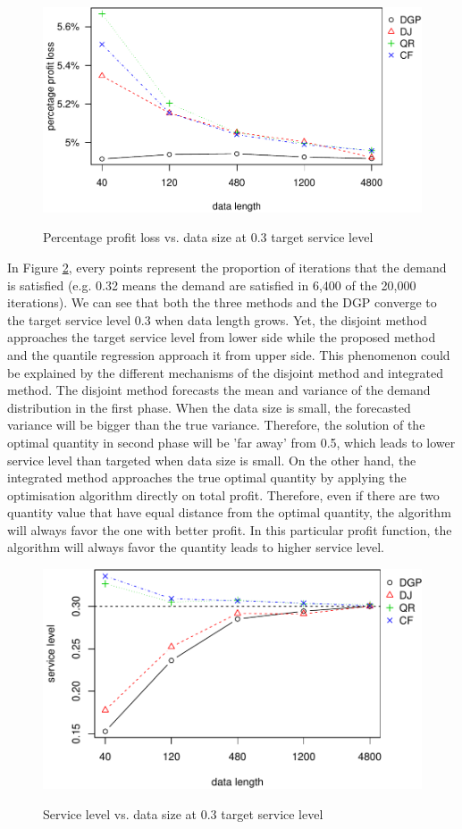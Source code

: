 \documentclass{article}
\begin{document}
\begin{figure}[ht]
\centering
\caption{Percentage profit loss vs. data size at 0.3 target service level}
\includegraphics{ppl0.3-1.pdf}
\label{fig:ppl0.3}
\end{figure}

In Figure \ref{fig:sl0.3}, every points represent the proportion of iterations that the demand is satisfied (e.g. 0.32 means the demand are satisfied in 6,400 of the 20,000 iterations). We can see that both the three methods and the DGP converge to the target service level 0.3 when data length grows. Yet, the disjoint method approaches the target service level from lower side while the proposed method and the quantile regression approach it from upper side. This phenomenon could be explained by the different mechanisms of the disjoint method and integrated method. The disjoint method forecasts the mean and variance of the demand distribution in the first phase. When the data size is small, the forecasted variance will be bigger than the true variance. Therefore, the solution of the optimal quantity in second phase will be 'far away' from 0.5, which leads to lower service level than targeted when data size is small. On the other hand, the integrated method approaches the true optimal quantity by applying the optimisation algorithm directly on total profit. Therefore, even if there are two quantity value that have equal distance from the optimal quantity, the algorithm will always favor the one with better profit. In this particular profit function, the algorithm will always favor the quantity leads to higher service level.

\begin{figure}[ht]
\centering
\caption{Service level vs. data size at 0.3 target service level}
\includegraphics{sl-3.pdf}
\label{fig:sl0.3}
\end{figure}
\end{document}
